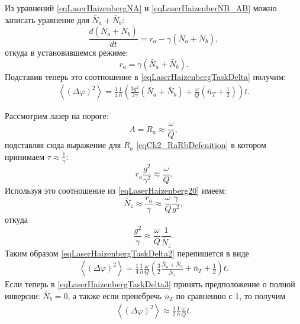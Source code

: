 Из уравнений \eqref{eqLaserHaizenbergNA} и 
\eqref{eqLaserHaizenberNB_AB} можно записать уравнение для
$\bar{N}_a+\bar{N}_b$: 
\begin{equation}
\frac{d\left(\bar{N}_a+\bar{N}_b\right)}{d t} = r_a - \gamma
\left(\bar{N}_a+\bar{N}_b\right), 
\nonumber
\end{equation}
откуда в установившемся режиме:
\begin{equation}
r_a = \gamma
\left(\bar{N}_a+\bar{N}_b\right).
\nonumber
\end{equation}
Подставив теперь это соотношение в \eqref{eqLaserHaizenbergTaskDelta}
получим: 
\begin{eqnarray}
\left<\left(\Delta \varphi\right)^2\right> = 
\frac{1}{4}\frac{1}{\bar{n}}
\left(
\frac{3 g^2}{2\gamma}\left(\bar{N}_a + \bar{N}_b\right) + 
\frac{\omega}{Q}\left(\bar{n}_T + \frac{1}{2}\right)
\right) t.
\label{eqLaserHaizenbergTaskDelta2}
\end{eqnarray}

Рассмотрим лазер на пороге:
\begin{equation}
A=R_a\approx \frac{\omega}{Q},
\nonumber
\end{equation}
подставляя сюда выражение для $R_a$ \eqref{eqCh2_RaRbDefenition} в
котором принимаем $\tau \approx \frac{1}{\gamma}$:
\begin{equation}
r_a \frac{g^2}{\gamma^2} \approx \frac{\omega}{Q}.
\nonumber 
\end{equation}
Используя это соотношение из \eqref{eqLaserHaizenberg20} имеем:
\begin{equation}
\bar{N}_z \approx
\frac{r_a}{\gamma} \approx \frac{\omega}{Q} \frac{\gamma}{g^2},
\nonumber
\end{equation}
откуда
\begin{equation}
\frac{g^2}{\gamma} \approx
\frac{\omega}{Q}\frac{1}{\bar{N}_z}.
\nonumber
\end{equation}
Таким образом \eqref{eqLaserHaizenbergTaskDelta2} перепишется в виде
\begin{eqnarray}
\left<\left(\Delta \varphi\right)^2\right> = 
\frac{1}{4}\frac{1}{\bar{n}}\frac{\omega}{Q}
\left(
\frac{3}{2}\frac{\bar{N}_a + \bar{N}_b}{\bar{N}_z} + 
\bar{n}_T + \frac{1}{2}
\right) t.
\label{eqLaserHaizenbergTaskDelta3}
\end{eqnarray}
Если теперь в \eqref{eqLaserHaizenbergTaskDelta3} принять
предположение о полной инверсии: $\bar{N}_b = 0$, а также если
пренебречь $\bar{n}_T$ по сравнению с 1, то получим
\begin{eqnarray}
\left<\left(\Delta \varphi\right)^2\right> \approx
\frac{1}{2}\frac{1}{\bar{n}}\frac{\omega}{Q} t.
\label{eqLaserHaizenbergTaskDelta4}
\end{eqnarray}

